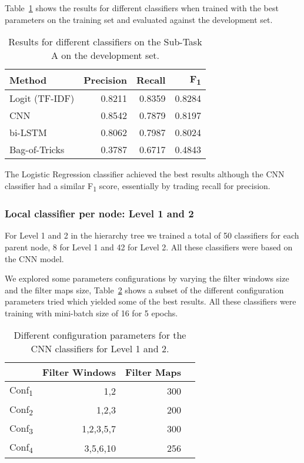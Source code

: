 \documentclass[11pt,a4paper]{article}
\begin{document}
Table~\ref{subtask_a_devset-results} shows the results for different classifiers
when trained with the best parameters on the training set and evaluated against
the development set.

\begin{table}[!h]
\begin{center}
\begin{tabular}{|l|r|r|r|}
\hline\centering\textbf{Method}  & \textbf{Precision} &  \textbf{Recall} &  \textbf{F\textsubscript{1}}\\
\hline
 Logit (TF-IDF) & 0.8211 & 0.8359 & 0.8284 \\
 CNN            & 0.8542 & 0.7879 & 0.8197 \\
 bi-LSTM        & 0.8062 & 0.7987 & 0.8024 \\
 Bag-of-Tricks  & 0.3787 & 0.6717 & 0.4843 \\
\hline
\end{tabular}
\end{center}
\caption{\label{subtask_a_devset-results} Results for different classifiers on
         the Sub-Task A on the development set.}
\end{table}

The Logistic Regression classifier achieved the best results
although the CNN classifier  had a similar F\textsubscript{1} score, essentially
by trading recall for precision.


\subsubsection{Local classifier per node: Level 1 and 2}

For Level 1 and 2 in the hierarchy tree we trained a total of 50 classifiers
for each parent node, 8 for Level 1 and 42 for Level 2. All these classifiers
were based on the CNN model.

We explored some parameters configurations by varying the filter windows size and
the filter maps size, Table~\ref{subtask_b_parameters_local} shows a subset of the different
configuration parameters tried which yielded some of the best results. All these
classifiers were training with mini-batch size of 16 for 5 epochs.

\begin{table}[!h]
\begin{center}
\begin{tabular}{|l|r|r|r|}
\hline\centering\textbf{}  & \textbf{Filter Windows} &  \textbf{Filter Maps} \\
\hline
Conf\textsubscript{1} & 1,2       & 300 \\
Conf\textsubscript{2} & 1,2,3     & 200 \\
Conf\textsubscript{3} & 1,2,3,5,7 & 300 \\
Conf\textsubscript{4} & 3,5,6,10  & 256 \\
\hline
\end{tabular}
\end{center}
\caption{\label{subtask_b_parameters_local} Different configuration parameters for the
         CNN classifiers for Level 1 and 2.}
\end{table}
\end{document}
